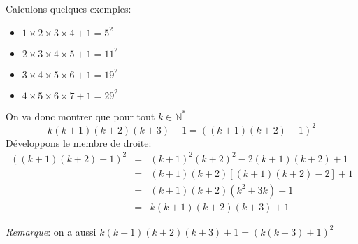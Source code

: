 Calculons quelques exemples: 
\begin{itemize}
  \item $1\times 2 \times 3 \times 4 + 1 = 5^2$
  \item $2\times 3 \times 4 \times 5+1 =11^2$
  \item $3 \times 4 \times 5 \times 6 +1 =19^2$
  \item $4 \times 5 \times 6 \times 7 +1 = 29^2$
\end{itemize}
On va donc montrer que pour tout $k\in\mathbb{N}^*$ 
\[ k(k+1)(k+2)(k+3)+1=\left( (k+1)(k+2) -1 \right)^2 \]
Développons le membre de droite:
\begin{eqnarray*}
  \left( (k+1)(k+2) -1 \right)^2 &=& (k+1)^2(k+2)^2 -2(k+1)(k+2)+1 \\
  &=& (k+1)(k+2)\left[ (k+1)(k+2)-2 \right]+1 \\
  &=& (k+1)(k+2)( k^2 + 3k )+1 \\
  &=& k(k+1)(k+2)(k+3)+1
\end{eqnarray*}

\textit{Remarque}: on a aussi $k(k+1)(k+2)(k+3)+1 = \left(k(k+3)+1\right)^2$
